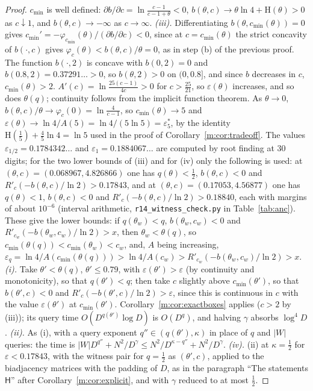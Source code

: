 \documentclass[11pt]{article}
\theoremstyle{definition}
\theoremstyle{remark}
\newcommand{\Hh}{\mathrm{H}}
\newcommand{\es}{\varepsilon^*_5}
\newcommand{\Hyp}{\mathsf{H}}
\newcommand{\HintedOMvRfourteen}{0.18840}%
\newcommand{\HypHalfRfourteen}{0.17843}%
\newcommand{\WitHalfTheta}{0.068967}%
\newcommand{\WitHalfC}{4.826866}%
\newcommand{\WitOneTheta}{0.17053}%
\newcommand{\WitOneC}{4.56877}%
\newcommand{\EpsHalfDigits}{0.1784342}%
\newcommand{\EpsOneDigits}{0.1884067}%
\begin{document}
\begin{proof}
$c_{\min}$ is well defined: $\partial b/\partial c=\ln\frac{c-1}{c-1+\theta}<0$, $b(\theta,c)\to\theta\ln4+\Hh(\theta)>0$ as $c\downarrow1$, and $b(\theta,c)\to-\infty$ as $c\to\infty$. \emph{(iii).} Differentiating $b(\theta,c_{\min}(\theta))=0$ gives $c_{\min}'=-\varphi_{c_{\min}}(\theta)/(\partial b/\partial c)<0$, since at $c=c_{\min}(\theta)$ the strict concavity of $b(\cdot,c)$ gives $\varphi_c(\theta)<b(\theta,c)/\theta=0$, as in step (b) of the previous proof. The function $b(\cdot,2)$ is concave with $b(0,2)=0$ and $b(0.8,2)=0.37291\ldots>0$, so $b(\theta,2)>0$ on $(0,0.8]$, and since $b$ decreases in $c$, $c_{\min}(\theta)>2$. $A'(c)=\ln\frac{25(c-1)}{4c}>0$ for $c>\frac{25}{21}$, so $\varepsilon(\theta)$ increases, and so does $\theta(q)$; continuity follows from the implicit function theorem. As $\theta\to0$, $b(\theta,c)/\theta\to\varphi_c(0)=\ln\frac4{c-1}$, so $c_{\min}(\theta)\to5$ and $\varepsilon(\theta)\to\ln4/A(5)=\ln4/(5\ln5)=\es$, by the identity $\Hh(\frac15)+\frac45\ln4=\ln5$ used in the proof of Corollary~\ref{m:cor:tradeoff}.
The values $\varepsilon_{1/2}=\EpsHalfDigits\ldots$ and $\varepsilon_1=\EpsOneDigits\ldots$ are computed by root finding at $30$ digits; for the two lower bounds of (iii) and for (iv) only the following is used: at $(\theta,c)=(\WitHalfTheta,\WitHalfC)$ one has $q(\theta)<\frac12$, $b(\theta,c)<0$ and $R'_c(-b(\theta,c)/\ln2)>\HypHalfRfourteen$, and at $(\theta,c)=(\WitOneTheta,\WitOneC)$ one has $q(\theta)<1$, $b(\theta,c)<0$ and $R'_c(-b(\theta,c)/\ln2)>\HintedOMvRfourteen$, each with margins of about $10^{-6}$ (interval arithmetic, \texttt{r14\_witness\_check.py} in Table~\ref{tab:anc}).
These give the lower bounds: if $q(\theta_w)<q$, $b(\theta_w,c_w)<0$ and $R'_{c_w}(-b(\theta_w,c_w)/\ln2)>x$, then $\theta_w<\theta(q)$, so $c_{\min}(\theta(q))<c_{\min}(\theta_w)<c_w$, and, $A$ being increasing, $\varepsilon_q=\ln4/A(c_{\min}(\theta(q)))>\ln4/A(c_w)>R'_{c_w}(-b(\theta_w,c_w)/\ln2)>x$.
\emph{(i).} Take $\theta'<\theta(q)$, $\theta'\le0.79$, with $\varepsilon(\theta')>\varepsilon$ (by continuity and monotonicity), so that $q(\theta')<q$; then take $c$ slightly above $c_{\min}(\theta')$, so that $b(\theta',c)<0$ and $R'_c(-b(\theta',c)/\ln2)>\varepsilon$, since this is continuous in $c$ with the value $\varepsilon(\theta')$ at $c_{\min}(\theta')$. Corollary~\ref{m:cor:exactboxes} applies ($c>2$ by (iii)); its query time $O(D^{q(\theta')}\log D)$ is $O(D^q)$, and halving $\gamma$ absorbs $\log^4\!D$. \emph{(ii).} As (i), with a query exponent $q''\in(q(\theta'),\kappa)$ in place of $q$ and $|W|$ queries: the time is $|W|D^{q''}+N^2/D^\gamma\le N^2/D^{\kappa-q''}+N^2/D^\gamma$. \emph{(iv).} (ii) at $\kappa=\frac12$ for $\varepsilon<\HypHalfRfourteen$, with the witness pair for $q=\frac12$ as $(\theta',c)$, applied to the biadjacency matrices with the padding of $D$, as in the paragraph ``The statements $\Hyp$'' after Corollary~\ref{m:cor:explicit}, and with $\gamma$ reduced to at most $\frac12$.
\end{proof}
\end{document}
